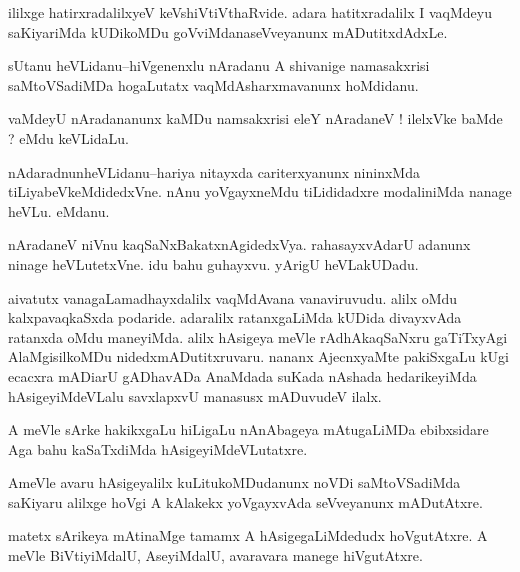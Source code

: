 \documentclass{article}
\begin{document}
\begin{mn}%
ililxge hatirxradalilxyeV keVshiVtiVthaRvide. adara hatitxradalilx I vaqMdeyu saKiyariMda 
kUDikoMDu goVviMdanaseVveyanunx mADutitxdAdxLe. 
\end{mn}

\begin{mn}%
sUtanu heVLidanu--hiVgenenxlu nAradanu A shivanige namasakxrisi saMtoVSadiMDa hogaLutatx 
vaqMdAsharxmavanunx hoMdidanu.
\end{mn}

\begin{mn}%
vaMdeyU nAradananunx kaMDu namsakxrisi eleY nAradaneV ! ilelxVke baMde ? eMdu keVLidaLu.
\end{mn}

\begin{mn}%
nAdaradnunheVLidanu--hariya nitayxda cariterxyanunx nininxMda tiLiyabeVkeMdidedxVne. nAnu 
yoVgayxneMdu tiLididadxre modaliniMda nanage heVLu. eMdanu.
\end{mn}

\begin{mn}%
nAradaneV niVnu kaqSaNxBakatxnAgidedxVya. rahasayxvAdarU adanunx ninage heVLutetxVne. idu 
bahu guhayxvu. yArigU heVLakUDadu.
\end{mn}

\begin{mn}%
aivatutx vanagaLamadhayxdalilx vaqMdAvana vanaviruvudu. alilx oMdu kalxpavaqkaSxda 
podaride. adaralilx ratanxgaLiMda kUDida divayxvAda ratanxda oMdu maneyiMda. alilx 
hAsigeya meVle rAdhAkaqSaNxru gaTiTxyAgi AlaMgisilkoMDu nidedxmADutitxruvaru. nananx 
AjecnxyaMte pakiSxgaLu kUgi ecacxra mADiarU gADhavADa AnaMdada suKada nAshada 
hedarikeyiMda hAsigeyiMdeVLalu savxlapxvU manasusx mADuvudeV ilalx.
\end{mn}

\begin{mn}%
A meVle sArke hakikxgaLu hiLigaLu nAnAbageya mAtugaLiMDa ebibxsidare Aga bahu kaSaTxdiMda 
hAsigeyiMdeVLutatxre.
\end{mn}

\begin{mn}%
AmeVle avaru hAsigeyalilx kuLitukoMDudanunx noVDi saMtoVSadiMda saKiyaru alilxge hoVgi A 
kAlakekx yoVgayxvAda seVveyanunx mADutAtxre.
\end{mn}

\begin{mn}%
matetx sArikeya mAtinaMge tamamx A hAsigegaLiMdedudx hoVgutAtxre. A meVle BiVtiyiMdalU, 
AseyiMdalU, avaravara manege hiVgutAtxre.
\end{mn}
\end{document}

